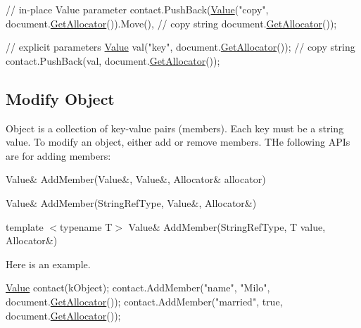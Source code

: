 \begin{DoxyCode}
\textcolor{comment}{// in-place Value parameter}
contact.PushBack(\hyperlink{document_8h_a071cf97155ba72ac9a1fc4ad7e63d481}{Value}(\textcolor{stringliteral}{"copy"}, document.\hyperlink{class_generic_document_aa4609d6b19f86aec1a6b96edf2c27686}{GetAllocator}()).Move(), \textcolor{comment}{// copy string}
                 document.\hyperlink{class_generic_document_aa4609d6b19f86aec1a6b96edf2c27686}{GetAllocator}());

\textcolor{comment}{// explicit parameters}
\hyperlink{class_generic_value}{Value} val(\textcolor{stringliteral}{"key"}, document.\hyperlink{class_generic_document_aa4609d6b19f86aec1a6b96edf2c27686}{GetAllocator}()); \textcolor{comment}{// copy string}
contact.PushBack(val, document.\hyperlink{class_generic_document_aa4609d6b19f86aec1a6b96edf2c27686}{GetAllocator}());
\end{DoxyCode}
\hypertarget{md_Cadriciel_Commun_Externe_RapidJSON_doc_tutorial.zh-cn_ModifyObject}{}\subsection{Modify Object}\label{md_Cadriciel_Commun_Externe_RapidJSON_doc_tutorial.zh-cn_ModifyObject}
Object is a collection of key-\/value pairs (members). Each key must be a string value. To modify an object, either add or remove members. T\+He following A\+P\+Is are for adding members\+:


\begin{DoxyItemize}
\item {\ttfamily Value\& Add\+Member(\+Value\&, Value\&, Allocator\& allocator)}
\item {\ttfamily Value\& Add\+Member(\+String\+Ref\+Type, Value\&, Allocator\&)}
\item {\ttfamily template $<$typename T$>$ Value\& Add\+Member(\+String\+Ref\+Type, T value, Allocator\&)}
\end{DoxyItemize}

Here is an example.


\begin{DoxyCode}
\hyperlink{class_generic_value}{Value} contact(kObject);
contact.AddMember(\textcolor{stringliteral}{"name"}, \textcolor{stringliteral}{"Milo"}, document.\hyperlink{class_generic_document_aa4609d6b19f86aec1a6b96edf2c27686}{GetAllocator}());
contact.AddMember(\textcolor{stringliteral}{"married"}, \textcolor{keyword}{true}, document.\hyperlink{class_generic_document_aa4609d6b19f86aec1a6b96edf2c27686}{GetAllocator}());
\end{DoxyCode}


